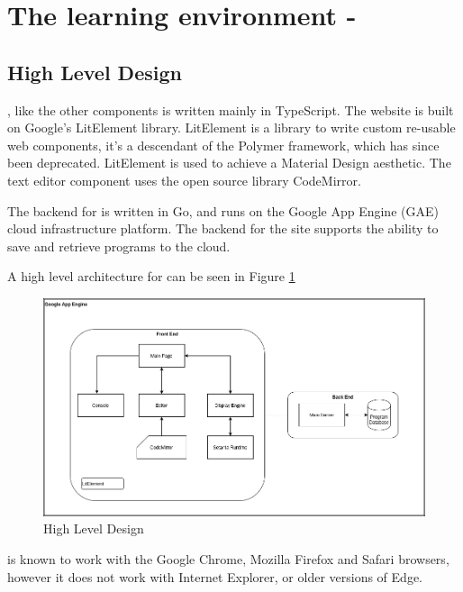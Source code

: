 \section{The learning environment - \trys{}}

\subsection{High Level Design}

\trys{}, like the other components is written mainly in TypeScript. The website is built on Google's LitElement library. LitElement is a library to write custom re-usable web components, it's a descendant of the Polymer framework, which has since been deprecated. LitElement is used to achieve a Material Design aesthetic. The text editor component uses the open source library CodeMirror.

The backend for \trys{} is written in Go, and runs on the Google App Engine (GAE) cloud infrastructure platform. The backend for the site supports the ability to save and retrieve \Setanta{} programs to the cloud.

A high level architecture for \trys{} can be seen in Figure \ref{trysetantadiagram}

\begin{figure}
    \caption{\trys{} High Level Design}
    \label{trysetantadiagram}
    \begin{center}
    \includegraphics[scale=0.4]{trysetantadiagram}
    \end{center}
\end{figure}

\trys{} is known to work with the Google Chrome, Mozilla Firefox and Safari browsers, however it does not work with Internet Explorer, or older versions of Edge.

